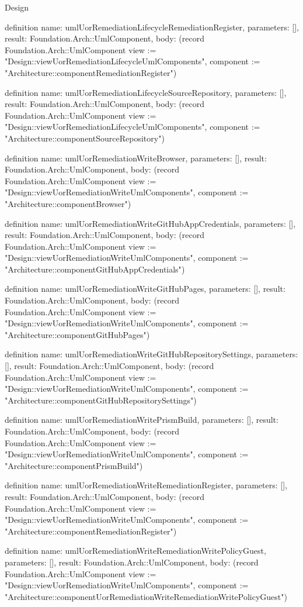 \begin{lexlean}{Design}
\begin{semanticmodule}
definition{
  name: umlUorRemediationLifecycleRemediationRegister,
  parameters: [],
  result: Foundation.Arch::UmlComponent,
  body: (record Foundation.Arch::UmlComponent {view := "Design::viewUorRemediationLifecycleUmlComponents", component := "Architecture::componentRemediationRegister"})
}

definition{
  name: umlUorRemediationLifecycleSourceRepository,
  parameters: [],
  result: Foundation.Arch::UmlComponent,
  body: (record Foundation.Arch::UmlComponent {view := "Design::viewUorRemediationLifecycleUmlComponents", component := "Architecture::componentSourceRepository"})
}

definition{
  name: umlUorRemediationWriteBrowser,
  parameters: [],
  result: Foundation.Arch::UmlComponent,
  body: (record Foundation.Arch::UmlComponent {view := "Design::viewUorRemediationWriteUmlComponents", component := "Architecture::componentBrowser"})
}

definition{
  name: umlUorRemediationWriteGitHubAppCredentials,
  parameters: [],
  result: Foundation.Arch::UmlComponent,
  body: (record Foundation.Arch::UmlComponent {view := "Design::viewUorRemediationWriteUmlComponents", component := "Architecture::componentGitHubAppCredentials"})
}

definition{
  name: umlUorRemediationWriteGitHubPages,
  parameters: [],
  result: Foundation.Arch::UmlComponent,
  body: (record Foundation.Arch::UmlComponent {view := "Design::viewUorRemediationWriteUmlComponents", component := "Architecture::componentGitHubPages"})
}

definition{
  name: umlUorRemediationWriteGitHubRepositorySettings,
  parameters: [],
  result: Foundation.Arch::UmlComponent,
  body: (record Foundation.Arch::UmlComponent {view := "Design::viewUorRemediationWriteUmlComponents", component := "Architecture::componentGitHubRepositorySettings"})
}

definition{
  name: umlUorRemediationWritePrismBuild,
  parameters: [],
  result: Foundation.Arch::UmlComponent,
  body: (record Foundation.Arch::UmlComponent {view := "Design::viewUorRemediationWriteUmlComponents", component := "Architecture::componentPrismBuild"})
}

definition{
  name: umlUorRemediationWriteRemediationRegister,
  parameters: [],
  result: Foundation.Arch::UmlComponent,
  body: (record Foundation.Arch::UmlComponent {view := "Design::viewUorRemediationWriteUmlComponents", component := "Architecture::componentRemediationRegister"})
}

definition{
  name: umlUorRemediationWriteRemediationWritePolicyGuest,
  parameters: [],
  result: Foundation.Arch::UmlComponent,
  body: (record Foundation.Arch::UmlComponent {view := "Design::viewUorRemediationWriteUmlComponents", component := "Architecture::componentUorRemediationWriteRemediationWritePolicyGuest"})
}


\end{semanticmodule}
\end{lexlean}
